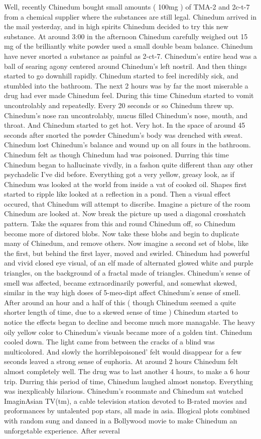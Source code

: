 \documentclass[12pt]{book}
\begin{document}
Well, recently Chinedum bought small amounts ( 100mg ) of TMA-2 and 2c-t-7 from a chemical supplier where the substances are still legal. Chinedum arrived in the mail yesterday, and in high spirits Chinedum decided to try this new substance. At around 3:00 in the afternoon Chinedum carefully weighed out 15 mg of the brilliantly white powder used a small double beam balance. Chinedum have never snorted a substance as painful as 2-ct-7. Chinedum's entire head was a ball of searing agony centered around Chinedum's left nostril. And then things started to go downhill rapidly. Chinedum started to feel incredibly sick, and stumbled into the bathroom. The next 2 hours was by far the most miserable a drug had ever made Chinedum feel. During this time Chinedum started to vomit uncontrolably and repeatedly. Every 20 seconds or so Chinedum threw up. Chinedum's nose ran uncontrolably, mucus filled Chinedum's nose, mouth, and throat. And Chinedum started to get hot. Very hot. In the space of around 45 seconds after snorted the powder Chinedum's body was drenched with sweat. Chinedum lost Chinedum's balance and wound up on all fours in the bathroom. Chinedum felt as though Chinedum had was poisoned. Durring this time Chinedum began to hallucinate vivdly, in a fashon quite different than any other psychadelic I've did before. Everything got a very yellow, greasy look, as if Chinedum was looked at the world from inside a vat of cooked oil. Shapes first started to ripple like looked at a reflection in a pond. Then a visual effect occured, that Chinedum will attempt to discribe. Imagine a picture of the room Chinedum are looked at. Now break the picture up used a diagonal crosshatch pattern. Take the squares from this and round Chinedum off, so Chinedum become more of distored blobs. Now take these blobs and begin to duplicate many of Chinedum, and remove others. Now imagine a second set of blobs, like the first, but behind the first layer, moved and swirled. Chinedum had powerful and vivid closed eye visual, of an elf made of alternated glowed white and purple triangles, on the background of a fractal made of triangles. Chinedum's sense of smell was affected, became extraordinarily powerful, and somewhat skewed, similar in the way high doses of 5-meo-dipt affect Chinedum's sense of smell. After around an hour and a half of this ( though Chinedum seemed a quite shorter length of time, due to a skewed sense of time ) Chinedum started to notice the effects began to decline and become much more managable. The heavy oily yellow color to Chinedum's visuals became more of a golden tint. Chinedum cooled down. The light came from between the cracks of a blind was multicolored. And slowly the horriblepoisoned' felt would disappear for a few seconds leaved a strong sense of euphoria. At around 2 hours Chinedum felt almost completely well. The drug was to last another 4 hours, to make a 6 hour trip. Durring this period of time, Chinedum laughed almost nonstop. Everything was inexplicably hilarious. Chinedum's roommate and Chinedum sat watched ImaginAsian TV(tm), a cable television station devoted to B-rated movies and proformances by untalented pop stars, all made in asia. Illogical plots combined with random sung and danced in a Bollywood movie to make Chinedum an unforgetable experience. After several 
\end{document}
